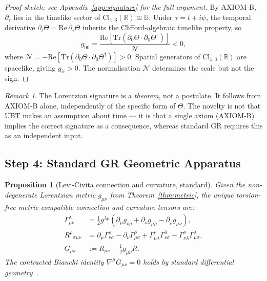 \documentclass[12pt,a4paper]{article}
\newtheorem{proposition}[theorem]{Proposition}
\theoremstyle{definition}
\theoremstyle{remark}
\newtheorem{remark}[theorem]{Remark}
\newcommand{\BB}{\mathbb{B}}
\newcommand{\RR}{\mathbb{R}}
\newcommand{\Tr}{\mathrm{Tr}}
\newcommand{\re}{\mathrm{Re}}
\newcommand{\calN}{\mathcal{N}}
\begin{document}
\begin{proof}[Proof sketch; see Appendix~\ref{app:signature} for the full argument]
By AXIOM-B, $\partial_\tau$ lies in the timelike sector of
$\mathrm{Cl}_{1,3}(\RR) \cong \BB$.
Under $\tau = t + i\psi$, the temporal derivative
$\partial_t\Theta = \re\,\partial_\tau\Theta$
inherits the Clifford-algebraic timelike property, so
\[
  g_{00}
  = \frac{\re[\Tr(\partial_0\Theta \cdot \partial_0\Theta^\dagger)]}{\calN} < 0,
\]
where $\calN = -\re[\Tr(\partial_0\Theta \cdot \partial_0\Theta^\dagger)] > 0$.
Spatial generators of $\mathrm{Cl}_{1,3}(\RR)$ are spacelike, giving $g_{ii} > 0$.
The normalisation $\calN$ determines the scale but not the sign.
\end{proof}

\begin{remark}
The Lorentzian signature is a \emph{theorem}, not a postulate.
It follows from AXIOM-B alone, independently of the specific form of $\Theta$.
The novelty is not that UBT makes an assumption about time --- it is that a single
axiom (AXIOM-B) implies the correct signature as a consequence, whereas standard
GR requires this as an independent input.
\end{remark}

\subsection{Step 4: Standard GR Geometric Apparatus}
\label{sec:step4}

\begin{proposition}[Levi-Civita connection and curvature, standard]
\label{prop:geometry}
Given the non-degenerate Lorentzian metric $g_{\mu\nu}$ from
Theorem~\ref{thm:metric}, the unique torsion-free metric-compatible connection
and curvature tensors are:
\begin{align}
  \Gamma^\lambda_{\mu\nu}
    &= \tfrac{1}{2}g^{\lambda\rho}
       (\partial_\mu g_{\nu\rho} + \partial_\nu g_{\mu\rho}
        - \partial_\rho g_{\mu\nu}), \\
  R^\rho{}_{\sigma\mu\nu}
    &= \partial_\mu\Gamma^\rho_{\nu\sigma}
       - \partial_\nu\Gamma^\rho_{\mu\sigma}
       + \Gamma^\rho_{\mu\lambda}\Gamma^\lambda_{\nu\sigma}
       - \Gamma^\rho_{\nu\lambda}\Gamma^\lambda_{\mu\sigma}, \\
  G_{\mu\nu}
    &:= R_{\mu\nu} - \tfrac{1}{2}g_{\mu\nu}R.
\end{align}
The contracted Bianchi identity $\nabla^\mu G_{\mu\nu} = 0$ holds by standard
differential geometry~\cite{wald1984,mtw1973}.
\end{proposition}
\end{document}
